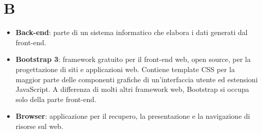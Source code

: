 \newpage
\section{B}

\begin{itemize}
	\item \textbf{Back-end}: parte di un sistema informatico che elabora i dati generati dal front-end.
	\item \textbf{Bootstrap 3}: framework gratuito per il front-end web, open source, per la progettazione di siti e applicazioni web. Contiene template CSS per la maggior parte delle componenti grafiche di un'interfaccia utente ed estensioni JavaScript. A differenza di molti altri framework web, Bootstrap si occupa solo della parte front-end.
	\item \textbf{Browser}: applicazione per il recupero, la presentazione e la navigazione di risorse sul web.
\end{itemize}
